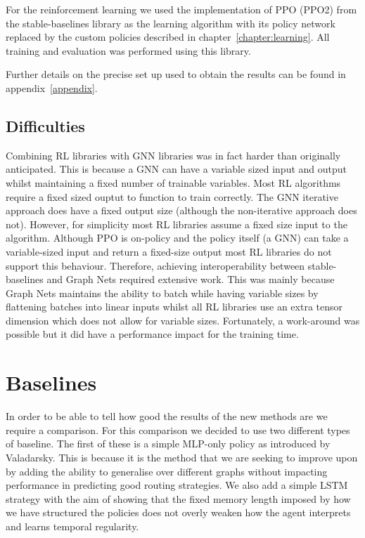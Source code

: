 For the reinforcement learning we used the implementation of PPO (PPO2) from the stable-baselines\cite{stable-baselines} library as the learning algorithm with its policy network replaced by the custom policies described in chapter~\ref{chapter:learning}. All training and evaluation was performed using this library.

Further details on the precise set up used to obtain the results can be found in appendix~\ref{appendix}.

\subsection{Difficulties}
Combining RL libraries with GNN libraries was in fact harder than originally anticipated. This is because a GNN can have a variable sized input and output whilst maintaining a fixed number of trainable variables. Most RL algorithms require a fixed sized ouptut to function to train correctly. The GNN iterative approach does have a fixed output size (although the non-iterative approach does not). However, for simplicity most RL libraries assume a fixed size input to the algorithm. Although PPO is on-policy and the policy itself (a GNN) can take a variable-sized input and return a fixed-size output most RL libraries do not support this behaviour. Therefore, achieving interoperability between stable-baselines and Graph Nets required extensive work. This was mainly because Graph Nets maintains the ability to batch while having variable sizes by flattening batches into linear inputs whilst all RL libraries use an extra tensor dimension which does not allow for variable sizes. Fortunately, a work-around was possible but it did have a performance impact for the training time.


\section{Baselines}
In order to be able to tell how good the results of the new methods are we require a comparison. For this comparison we decided to use two different types of baseline. The first of these is a simple MLP-only policy as introduced by Valadarsky. This is because it is the method that we are seeking to improve upon by adding the ability to generalise over different graphs without impacting performance in predicting good routing strategies. We also add a simple LSTM strategy with the aim of showing that the fixed memory length imposed by how we have structured the policies does not overly weaken how the agent interprets and learns temporal regularity.


